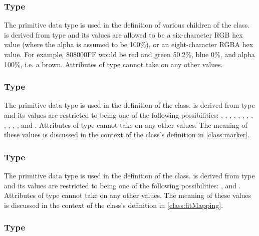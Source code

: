 \subsubsection[\element{SedColor}]{Type }
\label{type:sedColor}

The  primitive data type is used in the definition of various children of the \Style class.   is derived from type  and its values are allowed to be a six-character RGB hex value (where the alpha is assumed to be 100\%), or an eight-character RGBA hex value.  For example, 808000FF would be red and green 50.2\%, blue 0\%, and alpha 100\%, i.e. a brown.  Attributes of type  cannot take on any other values.

\subsubsection[\element{MarkerType}]{Type }
\label{type:markerType}

The  primitive data type is used in the definition of the \Marker class.   is derived from type  and its values are restricted to being one of the following possibilities: , , , , , , , , , , , , and .  Attributes of type  cannot take on any other values.  The meaning of these values is discussed in the context of the \Marker class's definition in \ref{class:marker}.


\subsubsection[\element{MappingType}]{Type }
\label{type:mappingType}

The  primitive data type is used in the definition of the \FitMapping class.   is derived from type  and its values are restricted to being one of the following possibilities: ,  and .  Attributes of type  cannot take on any other values.  The meaning of these values is discussed in the context of the \FitMapping class's definition in \ref{class:fitMapping}.


\subsubsection[\element{ExperimentType}]{Type }
\label{type:experimentType}

